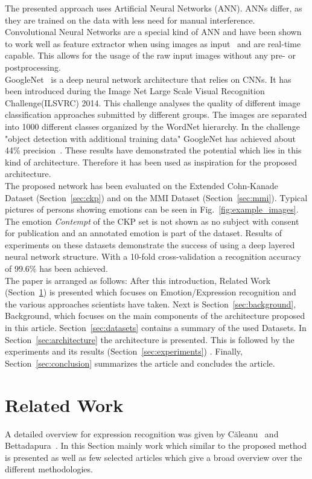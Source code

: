 \documentclass[10pt,journal,compsoc, hidelinks]{IEEEtran}
\begin{document}
The presented approach uses Artificial Neural Networks (ANN). ANNs differ, as they are trained on the data with less need for manual interference. 
Convolutional Neural Networks are a special kind of ANN and have been shown to work well as feature extractor when using images as input~\cite{donahue2013decaf} and are real-time capable. This allows for the usage of the raw input images without any pre- or postprocessing.\\
GoogleNet~\cite{DBLP:journals/corr/SzegedyLJSRAEVR14} is a deep neural network architecture that relies on CNNs. It has been introduced during the Image Net Large Scale Visual Recognition Challenge(ILSVRC) 2014. This challenge analyses the quality of different image classification approaches submitted by different groups. The images are separated into 1000 different classes organized by the WordNet hierarchy. In the challenge "object detection with additional training data" GoogleNet has achieved about 44\% precision~\cite{LSVRC-results}. These results have demonstrated the potential which lies in this kind of architecture. Therefore it has been used as inspiration for the proposed architecture.\\
The proposed network has been evaluated on the Extended Cohn-Kanade Dataset (Section~\ref{sec:ckp}) and on the MMI Dataset (Section~\ref{sec:mmi}). Typical pictures of persons showing emotions can be seen in Fig.~\ref{fig:example_images}.
The emotion \textit{Contempt} of the CKP set is not shown as no subject with consent for publication and an annotated emotion is part of the dataset. Results of experiments on these datasets demonstrate the success of using a deep layered neural network structure. With a 10-fold cross-validation a recognition accuracy of 99.6\% has been achieved. \\

The paper is arranged as follows: After this introduction, Related Work (Section~\ref{sec:related}) is presented which focuses on Emotion/Expression recognition and the various approaches scientists have taken. Next is Section~\ref{sec:background}, Background, which focuses on the main components of the architecture proposed in this article. Section~\ref{sec:datasets} contains a summary of the used Datasets. In Section~\ref{sec:architecture} the architecture is presented. This is followed by the experiments and its results (Section~\ref{sec:experiments}) . Finally, Section~\ref{sec:conclusion} summarizes the article and concludes the article. \section{Related Work}
\label{sec:related}
A detailed overview for expression recognition was given by C\u{a}leanu~\cite{caleanu2013face} and Bettadapura~\cite{bettadapura2012face}. In this Section mainly work which similar to the proposed method is presented as well as few selected articles which give a broad overview over the different methodologies.\\
\end{document}

